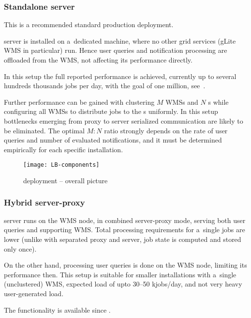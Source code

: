 

\subsubsection{Standalone \LB server}
\label{deploy-stand}

This is a recommended standard production deployment.

\LB server is installed on a~dedicated machine,
where no other grid services (gLite WMS in particular) run.
Hence user queries and notification processing are offloaded 
from the WMS, not affecting its performance directly.

In this setup the full reported performance is achieved,
currently up to several hundreds thousands jobs per day, with the goal
of one million, see~\cite{lbtp}.

Further performance can be gained with clustering $M$ WMSs and $N$ \LB{}s
while configuring all WMSs to distribute jobs to the \LB{}s uniformly.
In this setup bottlenecks emerging from \LB proxy to \LB server serialized
communication are likely to be eliminated.
The optimal $M:N$ ratio strongly depends on the rate of user queries
and number of evaluated notifications,
and it must be determined empirically for each specific installation.

\begin{figure}[ht]
\centering
\texttt{[image: LB-components]}
\caption{\LB deployment -- overall picture} 
\label{f:comp}
\end{figure}


\subsubsection{Hybrid \LB server-proxy}
\label{deploy-hybrid}

\LB server runs on the WMS node, in combined server-proxy mode,
serving both user queries and supporting WMS.
Total processing requirements for a~single jobs are lower
(unlike with separated proxy and server, job state is computed and stored only once).

On the other hand, processing user queries is done on the WMS node,
limiting its performance then.
This setup is suitable for smaller installations with a~single (unclustered)
WMS, expected load of upto 30--50 kjobs/day, and not very heavy user-generated
load.

The functionality is available since .

